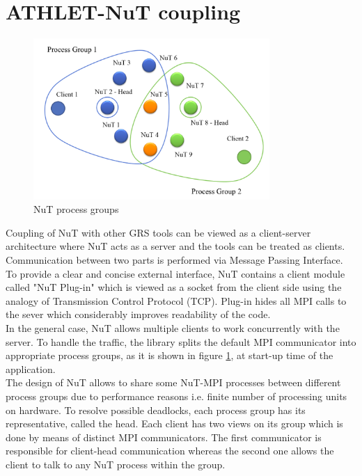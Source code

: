 \section{ATHLET-NuT coupling}
\label{sec:athlet-nut-coupling}

\figpointer{\ref{fig:introduction-nut-process-groups}}
\begin{figure}[htpb]
  \centering
  \includegraphics[width=0.8\textwidth]{figures/introduction-nut-process-groups.png}
\caption{NuT process groups}
\label{fig:introduction-nut-process-groups}
\end{figure}

Coupling of NuT with other GRS tools can be viewed as a client-server architecture where NuT acts as a server and the tools can be treated as clients. Communication between two parts is performed via Message Passing Interface.\\


To provide a clear and concise external interface, NuT contains a client module called "NuT Plug-in" which is viewed as a socket from the client side using the analogy of Transmission Control Protocol (TCP). Plug-in hides all MPI calls to the sever which considerably improves readability of the code.\\


In the general case, NuT allows multiple clients to work concurrently with the server. To handle the traffic, the library splits the default MPI communicator into appropriate process groups, as it is shown in figure \ref{fig:introduction-nut-process-groups}, at start-up time of the application.\\



The design of NuT allows to share some NuT-MPI processes between different process groups due to performance reasons i.e. finite number of processing units on hardware. To resolve possible deadlocks, each process group has its representative, called the head. Each client has two views on its group which is done by means of distinct MPI communicators. The first communicator is responsible for client-head communication whereas the second one allows the client to talk to any NuT process within the group.\\


